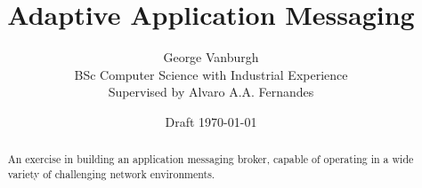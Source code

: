 \documentclass[a4paper,12pt,titlepage]{article}
\title{Adaptive Application Messaging}
\author{George Vanburgh\\
        BSc Computer Science with Industrial Experience\\
        Supervised by Alvaro A.A. Fernandes}
\date{Draft \today}
\begin{document}
  

  \maketitle

  \begin{abstract}
    An exercise in building an application messaging broker, capable of operating
    in a wide variety of challenging network environments.
  \end{abstract}

  \renewcommand{\abstractname}{Acknowledgements}
  \begin{abstract}
  \end{abstract}

  \tableofcontents
  \begin{versionhistory}
  \end{versionhistory}
  \newpage

  

  

  

  

  

  

  \newpage

  \printglossaries

  \newpage

  \printbibliography
\end{document}
